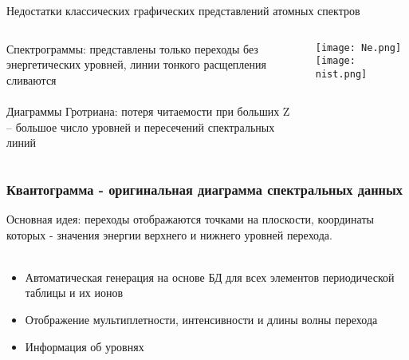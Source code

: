 \documentclass{beamer}
\begin{document}
\begin{frame}{Недостатки классических графических представлений атомных спектров}
    \begin{columns}
    \begin{column}{0.5\textwidth}
       Спектрограммы: представлены только переходы без энергетических уровней, линии тонкого расщепления сливаются
     \\~\\
    Диаграммы Гротриана: потеря читаемости при больших Z – большое число уровней и пересечений спектральных линий  
    \end{column}
    \begin{column}{0.5\textwidth}
      \texttt{[image: Ne.png]}
      \texttt{[image: nist.png]}
    \end{column}
  \end{columns}
\end{frame}

\begin{frame}
\frametitle{Квантограмма - оригинальная диаграмма спектральных данных}
    Основная идея: переходы отображаются точками на плоскости, координаты которых - значения энергии верхнего и нижнего уровней перехода.
    \\~\\
     \begin{itemize}
        \item Автоматическая генерация на основе БД для всех элементов периодической таблицы и их ионов
        \item Отображение мультиплетности, интенсивности и длины волны перехода
        \item Информация об уровнях
    \end{itemize}
\end{frame}
\end{document}
